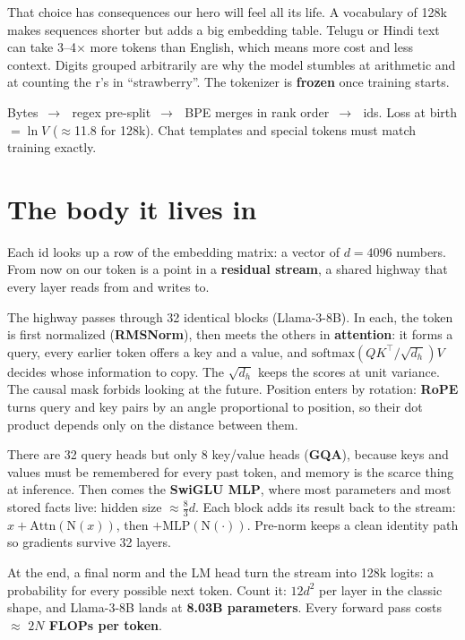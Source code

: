 \documentclass[10pt,a4paper]{extarticle}
\newcommand{\softmax}{\mathrm{softmax}}
\newcommand{\hl}[1]{{\color{acc2}\textbf{#1}}}
\newcommand{\ra}{\,{\color{mute}$\rightarrow$}\,}
\begin{document}
That choice has consequences our hero will feel all its life. A vocabulary of 128k makes sequences shorter but adds a big embedding table. Telugu or Hindi text can take 3--4$\times$ more tokens than English, which means more cost and less context. Digits grouped arbitrarily are why the model stumbles at arithmetic and at counting the r's in ``strawberry''. The tokenizer is \hl{frozen} once training starts.

\begin{mem}[Remember]
Bytes \ra\ regex pre-split \ra\ BPE merges in rank order \ra\ ids. Loss at birth $=\ln V$ ($\approx$11.8 for 128k). Chat templates and special tokens must match training exactly.
\end{mem}

\vspace{2mm}\section{The body it lives in}
Each id looks up a row of the embedding matrix: a vector of $d=4096$ numbers. From now on our token is a point in a \hl{residual stream}, a shared highway that every layer reads from and writes to.

The highway passes through 32 identical blocks (Llama-3-8B). In each, the token is first normalized (\hl{RMSNorm}), then meets the others in \hl{attention}: it forms a query, every earlier token offers a key and a value, and $\softmax(QK^\top/\sqrt{d_h})V$ decides whose information to copy. The $\sqrt{d_h}$ keeps the scores at unit variance. The causal mask forbids looking at the future. Position enters by rotation: \hl{RoPE} turns query and key pairs by an angle proportional to position, so their dot product depends only on the distance between them.

There are 32 query heads but only 8 key/value heads (\hl{GQA}), because keys and values must be remembered for every past token, and memory is the scarce thing at inference. Then comes the \hl{SwiGLU MLP}, where most parameters and most stored facts live: hidden size $\approx\frac83 d$. Each block adds its result back to the stream: $x+\mathrm{Attn}(\mathrm{N}(x))$, then $+\mathrm{MLP}(\mathrm{N}(\cdot))$. Pre-norm keeps a clean identity path so gradients survive 32 layers.

At the end, a final norm and the LM head turn the stream into 128k logits: a probability for every possible next token. Count it: $12d^2$ per layer in the classic shape, and Llama-3-8B lands at \hl{8.03B parameters}. Every forward pass costs $\approx$ \hl{$2N$ FLOPs per token}.
\end{document}
